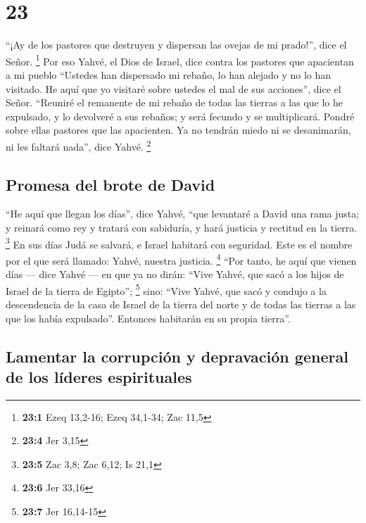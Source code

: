 \hypertarget{section-22}{%
\section{23}\label{section-22}}

 ``¡Ay de los pastores que destruyen y dispersan las
ovejas de mi prado!'', dice el Señor. \footnote{\textbf{23:1} Ezeq
  13,2-16; Ezeq 34,1-34; Zac 11,5}  Por eso Yahvé, el Dios
de Israel, dice contra los pastores que apacientan a mi pueblo ``Ustedes
han dispersado mi rebaño, lo han alejado y no lo han visitado. He aquí
que yo visitaré sobre ustedes el mal de sus acciones'', dice el Señor.
 ``Reuniré el remanente de mi rebaño de todas las tierras
a las que lo he expulsado, y lo devolveré a sus rebaños; y será fecundo
y se multiplicará.  Pondré sobre ellas pastores que las
apacienten. Ya no tendrán miedo ni se desanimarán, ni les faltará
nada'', dice Yahvé. \footnote{\textbf{23:4} Jer 3,15}

\hypertarget{promesa-del-brote-de-david}{%
\subsection{Promesa del brote de
David}\label{promesa-del-brote-de-david}}

 ``He aquí que llegan los días'', dice Yahvé, ``que
levantaré a David una rama justa; y reinará como rey y tratará con
sabiduría, y hará justicia y rectitud en la tierra. \footnote{\textbf{23:5}
  Zac 3,8; Zac 6,12; Is 21,1}  En sus días Judá se
salvará, e Israel habitará con seguridad. Este es el nombre por el que
será llamado: Yahvé, nuestra justicia. \footnote{\textbf{23:6} Jer 33,16}
 ``Por tanto, he aquí que vienen días --- dice Yahvé ---
en que ya no dirán: ``Vive Yahvé, que sacó a los hijos de Israel de la
tierra de Egipto''; \footnote{\textbf{23:7} Jer 16,14-15} 
sino: ``Vive Yahvé, que sacó y condujo a la descendencia de la casa de
Israel de la tierra del norte y de todas las tierras a las que los había
expulsado''. Entonces habitarán en su propia tierra''.

\hypertarget{lamentar-la-corrupciuxf3n-y-depravaciuxf3n-general-de-los-luxedderes-espirituales}{%
\subsection{Lamentar la corrupción y depravación general de los líderes
espirituales}\label{lamentar-la-corrupciuxf3n-y-depravaciuxf3n-general-de-los-luxedderes-espirituales}}

